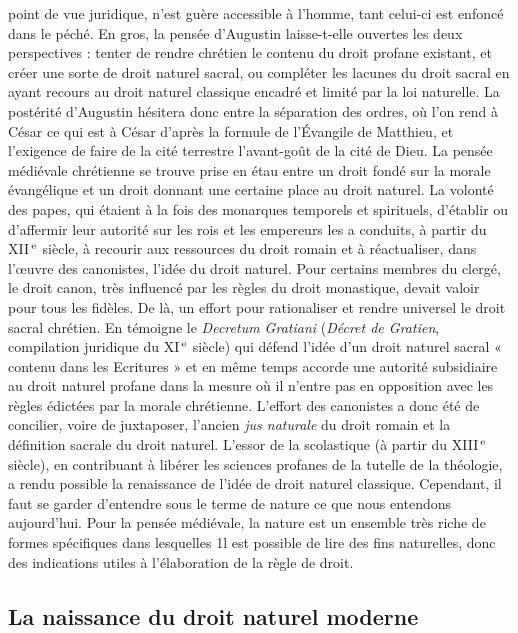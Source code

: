 point de vue juridique, n’est guère accessible à l’homme, tant celui-ci est enfoncé
dans le péché. En gros, la pensée d’Augustin laisse-t-elle ouvertes les deux perspectives : tenter de rendre chrétien le
contenu du droit profane existant, et créer
une sorte de droit naturel sacral, ou
compléter les lacunes du droit sacral en
ayant recours au droit naturel classique
encadré et limité par la loi naturelle. La
postérité d’Augustin hésitera donc entre
%
la séparation des ordres, où l’on rend à
César ce qui est à César d’après la formule de l'Évangile de Matthieu, et l’exigence de faire de la cité terrestre
 l’avant-goût de la cité de Dieu. La pensée médiévale chrétienne se trouve prise en étau
entre un droit fondé sur la morale évangélique et un droit donnant une certaine
place au droit naturel. La volonté des
papes, qui étaient à la fois des monarques
temporels et spirituels, d'établir ou d’affermir leur autorité sur les rois et les
empereurs les a conduits, à partir du
{\footnotesize XII}$^\text{\,e}$ siècle, à recourir aux ressources du droit
romain et à réactualiser, dans l’œuvre des
canonistes, l’idée du droit naturel. Pour
certains membres du clergé, le droit
canon, très influencé par les règles du
droit monastique, devait valoir pour tous
les fidèles. De là, un effort pour rationaliser et rendre universel le droit sacral chrétien.
 En témoigne le {\it Decretum Gratiani}
({\it Décret de Gratien}, compilation juridique
du {\footnotesize XI}$^\text{\,e}$ siècle) qui défend l’idée d’un droit
naturel sacral « contenu dans les Ecritures » et en même temps accorde une autorité subsidiaire au droit naturel profane
dans la mesure où il n’entre pas en opposition avec les règles édictées par la
morale chrétienne. L’effort des canonistes
a donc été de concilier, voire de juxtaposer, l’ancien {\it jus naturale} du droit romain
et la définition sacrale du droit naturel.
L’essor de la scolastique (à partir du {\footnotesize XIII}$^\text{\,e}$ siècle), en contribuant à libérer les
sciences profanes de la tutelle de la théologie, a rendu possible la renaissance de
l’idée de droit naturel classique. Cependant, il faut se garder d’entendre sous le
terme de nature ce que nous entendons
aujourd’hui. Pour la pensée médiévale, la
nature est un ensemble très riche de
formes spécifiques dans lesquelles 1l est
possible de lire des fins naturelles, donc
des indications utiles à l'élaboration de la
règle de droit.

\subsection{La naissance du droit naturel moderne}

